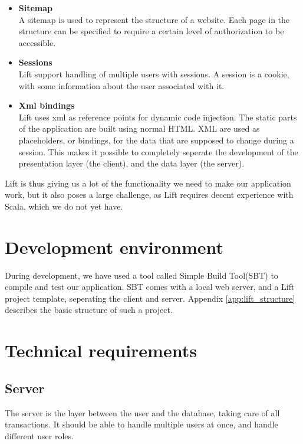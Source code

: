 \begin{itemize}
	\item \textbf{Sitemap}\\
	A sitemap is used to represent the structure of a website. Each page in the structure can be specified to require a certain level of authorization to be accessible. \\
	\item \textbf{Sessions}\\
	Lift support handling of multiple users with sessions. A session is a cookie, with some information about the user associated with it.\\
	\item \textbf{Xml bindings}\\
	Lift uses xml as reference points for dynamic code injection. The static parts of the application are built using normal HTML. XML are used as placeholders, or bindings, for the data that are supposed to change during a session. This makes it possible to completely seperate the development of the presentation layer (the client), and the data layer (the server).
\end{itemize}

Lift is thus giving us a lot of the functionality we need to make our application work, but it also poses a large challenge, as Lift requires decent experience with Scala, which we do not yet have.

\section{Development environment}
\label{sec:development_environment}
During development, we have used a tool called Simple Build Tool(SBT)\cite{sbt} to compile and test our application. SBT comes with a local web server, and a Lift project template, seperating the client and server. Appendix \ref{app:lift_structure} describes the basic structure of such a project.

\section{Technical requirements}
\label{sec:tech_req}

\subsection{Server}
\label{sub:server}
The server is the layer between the user and the database, taking care of all transactions. It should be able to handle multiple users at once, and handle different user roles.


